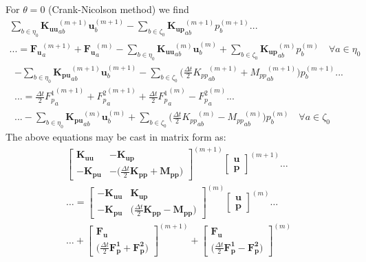 \documentclass[11pt]{article} %
\begin{document}
For $\theta = 0$ (Crank-Nicolson method) we find
\begin{eqnarray}
	\sum_{b \in \eta_0} \mathbf{K_{uu}}_{ab}^{(m+1)} \mathbf{u}_b^{(m+1)} - \sum_{b \in \zeta_0} \mathbf{K_{up}}_{ab}^{(m+1)} p_b^{(m+1)} ... \qquad \qquad \nonumber \\
	... = \mathbf{F_{u}}_{a}^{(m+1)} + \mathbf{F_{u}}_{a}^{(m)} - \sum_{b \in \eta_0} \mathbf{K_{uu}}_{ab}^{(m)} \mathbf{u}_b^{(m)} + \sum_{b \in \zeta_0} \mathbf{K_{up}}_{ab}^{(m)} p_b^{(m)} \quad \forall a \in \eta_0
\end{eqnarray}
\begin{eqnarray}
	 - \sum_{b \in \eta_0} \mathbf{K_{pu}}_{ab}^{(m+1)} \mathbf{u}_b^{(m+1)} - \sum_{b \in \zeta_0} \bigg( \frac{\Delta t}{2} {K_{pp}}_{ab}^{(m+1)} + {M_{pp}}_{ab}^{(m+1)} \bigg) p_b^{(m+1)}  ... \nonumber \\
	... = \frac{\Delta t}{2} {F^1_{p}}_{a}^{(m+1)} + {F^2_{p}}_{a}^{(m+1)} + \frac{\Delta t}{2} {F^1_{p}}_{a}^{(m)} - {F^2_{p}}_{a}^{(m)} ... \nonumber \\
	... - \sum_{b \in \eta_0} \mathbf{K_{pu}}_{ab}^{(m)} \mathbf{u}_b^{(m)} + \sum_{b \in \zeta_0} \bigg( \frac{\Delta t}{2} {K_{pp}}_{ab}^{(m)} - {M_{pp}}_{ab}^{(m)} \bigg) p_b^{(m)} \quad \forall a \in \zeta_0
\end{eqnarray}
The above equations may be cast in matrix form as:
\begin{eqnarray}
	\left[
	\begin{array}{cc}
		\mathbf{K_{uu}} & -\mathbf{K_{up}} \\
		-\mathbf{K_{pu}} & -\bigg( \frac{\Delta t}{2} \mathbf{K_{pp}} + \mathbf{M_{pp}} \bigg)
	\end{array} \right] ^{(m+1)}
	\left[
	\begin{array}{c}
		\mathbf{u} \\
		\mathbf{p}
	\end{array} \right] ^{(m+1)} \ldots \nonumber \\
	\ldots = \left[
	\begin{array}{cc}
		-\mathbf{K_{uu}} & \mathbf{K_{up}} \\
		-\mathbf{K_{pu}} & \bigg( \frac{\Delta t}{2} \mathbf{K_{pp}} - \mathbf{M_{pp}} \bigg)
	\end{array} \right] ^{(m)}
	\left[
	\begin{array}{c}
		\mathbf{u} \\
		\mathbf{p}
	\end{array} \right] ^{(m)} \ldots \nonumber \\
	\ldots + \left[
	\begin{array}{c}
		\mathbf{F_u} \\
		 \bigg( \frac{\Delta t}{2} \mathbf{F^1_{p}} + \mathbf{F^2_{p}} \bigg)
	\end{array} \right] ^{(m+1)} +
	\left[
	\begin{array}{c}
		\mathbf{F_u} \\
		 \bigg( \frac{\Delta t}{2} \mathbf{F^1_{p}} - \mathbf{F^2_{p}} \bigg)
	\end{array} \right] ^{(m)}
	\label{eq:matrixequations1}
\end{eqnarray}
\end{document}
